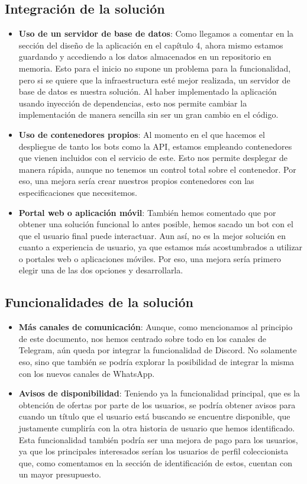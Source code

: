 \subsection{Integración de la solución}
\begin{itemize}
    \item \textbf{Uso de un servidor de base de datos}: Como llegamos a comentar en 
    la sección del diseño de la aplicación en el capítulo 4, ahora mismo estamos 
    guardando y accediendo a los datos almacenados en un repositorio en memoria. 
    Esto para el inicio no supone un problema para la funcionalidad, pero si se 
    quiere que la infraestructura esté mejor realizada, un servidor de base de 
    datos es nuestra solución. Al haber implementado la aplicación usando inyección 
    de dependencias, esto nos permite cambiar la implementación de manera sencilla 
    sin ser un gran cambio en el código.
    \item \textbf{Uso de contenedores propios}: Al momento en el que hacemos el 
    despliegue de tanto los bots como la API, estamos empleando contenedores que 
    vienen incluidos con el servicio de este. Esto nos permite desplegar de manera 
    rápida, aunque no tenemos un control total sobre el contenedor. Por eso, una 
    mejora sería crear nuestros propios contenedores con las especificaciones que 
    necesitemos.
    \item \textbf{Portal web o aplicación móvil}: También hemos comentado que por 
    obtener una solución funcional lo antes posible, hemos sacado un bot con el que 
    el usuario final puede interactuar. Aun así, no es la mejor solución en cuanto 
    a experiencia de usuario, ya que estamos más acostumbrados a utilizar o 
    portales web o aplicaciones móviles. Por eso, una mejora sería primero elegir 
    una de las dos opciones y desarrollarla.
\end{itemize}

\subsection{Funcionalidades de la solución}
\begin{itemize}
    \item \textbf{Más canales de comunicación}: Aunque, como mencionamos al 
    principio de este documento, nos hemos centrado sobre todo en los canales de 
    Telegram, aún queda por integrar la funcionalidad de Discord. No solamente eso, 
    sino que también se podría explorar la posibilidad de integrar la misma con 
    los nuevos canales de WhatsApp.
    \item \textbf{Avisos de disponibilidad}: Teniendo ya la funcionalidad 
    principal, que es la obtención de ofertas por parte de los usuarios, se podría 
    obtener avisos para cuando un título que el usuario está buscando se encuentre 
    disponible, que justamente cumpliría con la otra historia de usuario que hemos 
    identificado. Esta funcionalidad también podría ser una mejora de pago para los 
    usuarios, ya que los principales interesados serían los usuarios de perfil 
    coleccionista que, como comentamos en la sección de identificación de estos, 
    cuentan con un mayor presupuesto.
\end{itemize}